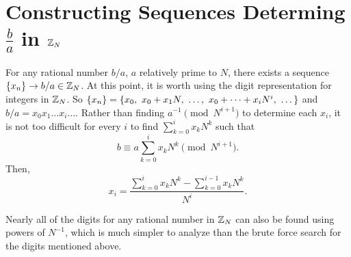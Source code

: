 \section{Constructing Sequences Determing $\frac{b}{a}$ in $\mathbb{Z}_N$}

\par For any rational number $b/a$, $a$ relatively prime to $N$, there
exists a sequence $\{x_n\} \rightarrow b/a \in \mathbb{Z}_N$. At this point, it is worth
using the digit representation for integers in $\mathbb{Z}_N$. So
$\xn=\{x_0, \ x_0+x_1N, \ \dots, \ x_0+\dots+x_iN^i, \ \dots\}$
and $b/a = x_0x_1\dots x_i\dots$. Rather than finding $a^{-1}\pmod N^{i+1}$ to
determine each $x_i$, it is not too difficult for every $i$ to find $\sum_{k=0}^ix_kN^k$
such that
\begin{equation}\label{eq:seq-rational}
  b \equiv a\sum_{k=0}^ix_kN^k \pmod{N^{i+1}}.
\end{equation}
Then, 
\begin{equation}
  x_i = \frac{\sum_{k=0}^ix_kN^k - \sum_{k=0}^{i-1}x_kN^k}{N^i}.
\end{equation}

\par Nearly all of the digits for any rational number in $\mathbb{Z}_N$ can also
be found using powers of $N^{-1}$, which is much simpler to analyze
than the brute force search for the digits mentioned above.

